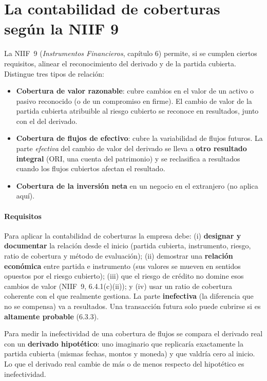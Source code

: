 \section{La contabilidad de coberturas según la NIIF 9}

La NIIF~9 (\emph{Instrumentos Financieros}, capítulo 6) permite, si se cumplen ciertos requisitos, alinear el reconocimiento del derivado y de la partida cubierta. Distingue tres tipos de relación:

\begin{definicion}
\begin{itemize}
\item \textbf{Cobertura de valor razonable}: cubre cambios en el valor de un activo o pasivo reconocido (o de un compromiso en firme). El cambio de valor de la partida cubierta atribuible al riesgo cubierto se reconoce en resultados, junto con el del derivado.
\item \textbf{Cobertura de flujos de efectivo}: cubre la variabilidad de flujos futuros. La parte \emph{efectiva} del cambio de valor del derivado se lleva a \textbf{otro resultado integral} (ORI, una cuenta del patrimonio) y se reclasifica a resultados cuando los flujos cubiertos afectan el resultado.
\item \textbf{Cobertura de la inversión neta} en un negocio en el extranjero (no aplica aquí).
\end{itemize}
\end{definicion}

\paragraph{Requisitos} Para aplicar la contabilidad de coberturas la empresa debe: (i) \textbf{designar y documentar} la relación desde el inicio (partida cubierta, instrumento, riesgo, ratio de cobertura y método de evaluación); (ii) demostrar una \textbf{relación económica} entre partida e instrumento (sus valores se mueven en sentidos opuestos por el riesgo cubierto); (iii) que el riesgo de crédito no domine esos cambios de valor (NIIF~9, 6.4.1(c)(ii)); y (iv) usar un ratio de cobertura coherente con el que realmente gestiona. La parte \textbf{inefectiva} (la diferencia que no se compensa) va a resultados. Una transacción futura solo puede cubrirse si es \textbf{altamente probable} (6.3.3).

\begin{definicion}
Para medir la inefectividad de una cobertura de flujos se compara el derivado real con un \textbf{derivado hipotético}: uno imaginario que replicaría exactamente la partida cubierta (mismas fechas, montos y moneda) y que valdría cero al inicio. Lo que el derivado real cambie de más o de menos respecto del hipotético es inefectividad.
\end{definicion}

